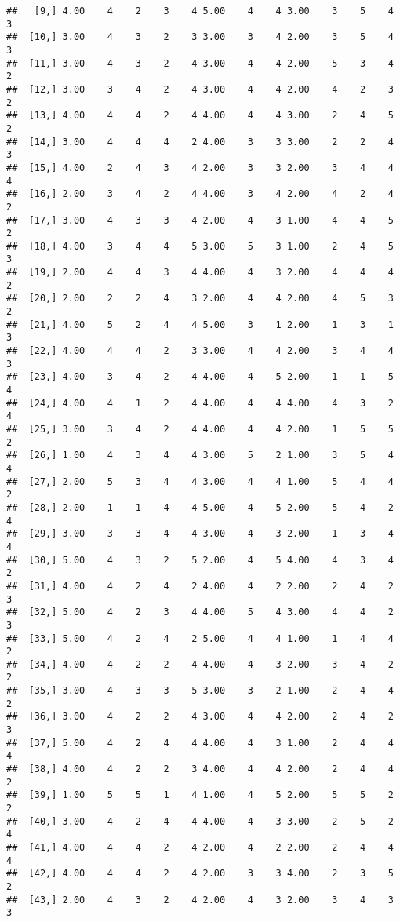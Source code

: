 \documentclass[]{article}
\begin{document}
\begin{verbatim}
##   [9,] 4.00    4    2    3    4 5.00    4    4 3.00    3    5    4    3
##  [10,] 3.00    4    3    2    3 3.00    3    4 2.00    3    5    4    3
##  [11,] 3.00    4    3    2    4 3.00    4    4 2.00    5    3    4    2
##  [12,] 3.00    3    4    2    4 3.00    4    4 2.00    4    2    3    2
##  [13,] 4.00    4    4    2    4 4.00    4    4 3.00    2    4    5    2
##  [14,] 3.00    4    4    4    2 4.00    3    3 3.00    2    2    4    3
##  [15,] 4.00    2    4    3    4 2.00    3    3 2.00    3    4    4    4
##  [16,] 2.00    3    4    2    4 4.00    3    4 2.00    4    2    4    2
##  [17,] 3.00    4    3    3    4 2.00    4    3 1.00    4    4    5    2
##  [18,] 4.00    3    4    4    5 3.00    5    3 1.00    2    4    5    3
##  [19,] 2.00    4    4    3    4 4.00    4    3 2.00    4    4    4    2
##  [20,] 2.00    2    2    4    3 2.00    4    4 2.00    4    5    3    2
##  [21,] 4.00    5    2    4    4 5.00    3    1 2.00    1    3    1    3
##  [22,] 4.00    4    4    2    3 3.00    4    4 2.00    3    4    4    3
##  [23,] 4.00    3    4    2    4 4.00    4    5 2.00    1    1    5    4
##  [24,] 4.00    4    1    2    4 4.00    4    4 4.00    4    3    2    4
##  [25,] 3.00    3    4    2    4 4.00    4    4 2.00    1    5    5    2
##  [26,] 1.00    4    3    4    4 3.00    5    2 1.00    3    5    4    4
##  [27,] 2.00    5    3    4    4 3.00    4    4 1.00    5    4    4    2
##  [28,] 2.00    1    1    4    4 5.00    4    5 2.00    5    4    2    4
##  [29,] 3.00    3    3    4    4 3.00    4    3 2.00    1    3    4    4
##  [30,] 5.00    4    3    2    5 2.00    4    5 4.00    4    3    4    2
##  [31,] 4.00    4    2    4    2 4.00    4    2 2.00    2    4    2    3
##  [32,] 5.00    4    2    3    4 4.00    5    4 3.00    4    4    2    3
##  [33,] 5.00    4    2    4    2 5.00    4    4 1.00    1    4    4    2
##  [34,] 4.00    4    2    2    4 4.00    4    3 2.00    3    4    2    2
##  [35,] 3.00    4    3    3    5 3.00    3    2 1.00    2    4    4    2
##  [36,] 3.00    4    2    2    4 3.00    4    4 2.00    2    4    2    3
##  [37,] 5.00    4    2    4    4 4.00    4    3 1.00    2    4    4    4
##  [38,] 4.00    4    2    2    3 4.00    4    4 2.00    2    4    4    2
##  [39,] 1.00    5    5    1    4 1.00    4    5 2.00    5    5    2    2
##  [40,] 3.00    4    2    4    4 4.00    4    3 3.00    2    5    2    4
##  [41,] 4.00    4    4    2    4 2.00    4    2 2.00    2    4    4    4
##  [42,] 4.00    4    4    2    4 2.00    3    3 4.00    2    3    5    2
##  [43,] 2.00    4    3    2    4 2.00    4    3 2.00    3    4    3    3

\end{verbatim}
\end{document}
